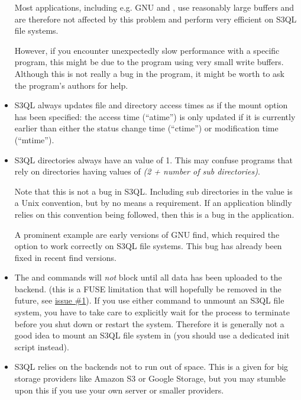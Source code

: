 \documentclass[letterpaper,10pt,english]{sphinxmanual}
\begin{document}
\begin{itemize}
Most applications, including e.g. GNU  and , use
reasonably large buffers and are therefore not affected by this
problem and perform very efficient on S3QL file systems.

However, if you encounter unexpectedly slow performance with a
specific program, this might be due to the program using very small
write buffers. Although this is not really a bug in the program,
it might be worth to ask the program's authors for help.

\item {} 
S3QL always updates file and directory access times as if the 
mount option has been specified: the access time (``atime'') is only updated
if it is currently earlier than either the status change time
(``ctime'') or modification time (``mtime'').

\item {} 
S3QL directories always have an  value of 1. This may confuse
programs that rely on directories having  values of \emph{(2 +
number of sub directories)}.

Note that this is not a bug in S3QL. Including sub directories in
the  value is a Unix convention, but by no means a
requirement. If an application blindly relies on this convention
being followed, then this is a bug in the application.

A prominent example are early versions of GNU find, which required
the  option to work correctly on S3QL file systems. This
bug has already been fixed in recent find versions.

\item {} 
The  and  commands will \emph{not} block until all
data has been uploaded to the backend. (this is a FUSE limitation
that will hopefully be removed in the future, see \href{https://bitbucket.org/nikratio/s3ql/issue/1/blocking-fusermount-and-umount}{issue \#1}). If
you use either command to unmount an S3QL file system, you have to
take care to explicitly wait for the  process to
terminate before you shut down or restart the system. Therefore it
is generally not a good idea to mount an S3QL file system in
 (you should use a dedicated init script instead).

\item {} 
S3QL relies on the backends not to run out of space. This is a given
for big storage providers like Amazon S3 or Google Storage, but you
may stumble upon this if you use your own server or smaller providers.


\end{itemize}
\end{document}
